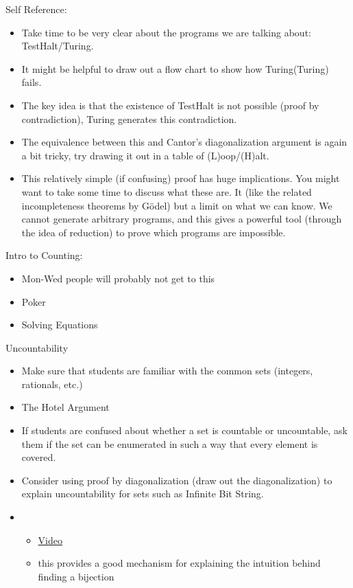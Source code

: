 \documentclass{exam}
\begin{document}
\begin{questions}
\item Self Reference: 
\begin{itemize}
  \item Take time to be very clear about the programs we are talking about: TestHalt/Turing.
  \item It might be helpful to draw out a flow chart to show how Turing(Turing) fails.
  \item The key idea is that the existence of TestHalt is not possible (proof by contradiction), Turing generates this contradiction.
  \item The equivalence between this and Cantor's diagonalization argument is again a bit tricky, try drawing it out in a table of (L)oop/(H)alt.
  \item This relatively simple (if confusing) proof has huge implications. You might want to take some time to discuss what these are. It (like the related incompleteness theorems by G\"odel) but a limit on what we can know. We cannot generate arbitrary programs, and this gives a powerful tool (through the idea of reduction) to prove which programs are impossible.
\end{itemize}
\item Intro to Counting: 
\begin{itemize}
\item Mon-Wed people will probably not get to this
\item Poker
\item Solving Equations
\end{itemize}
\item Uncountability
\begin{itemize}
\item Make sure that students are familiar with the common sets (integers, rationals, etc.)
\item The Hotel Argument 
\item If students are confused about whether a set is countable or uncountable, ask them if the set can be enumerated in such a way that every element is covered.
\item Consider using proof by diagonalization (draw out the diagonalization) to explain uncountability for sets such as Infinite Bit String.
\item 
\begin{itemize}
\item \href{https://www.youtube.com/watch?v=6NlwpEArfwk&list=PL-XXv-cvA_iD8wQm8U0gG_Z1uHjImKXFy&index=13}{Video}
\item this provides a good mechanism for explaining the intuition behind finding a bijection

\end{itemize}
\end{itemize}
\end{questions}
\end{document}
